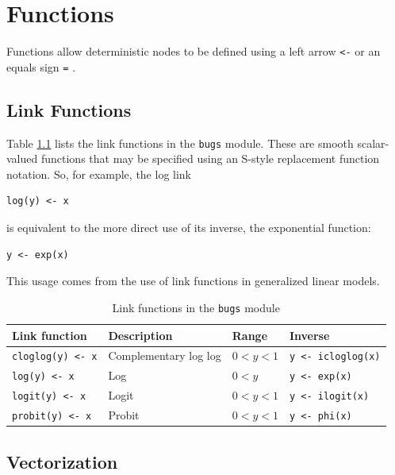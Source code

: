 \documentclass[11pt, a4paper, titlepage]{report}
\begin{document}
\chapter{Functions}
\label{section:functions}

Functions allow deterministic nodes to be defined using a left arrow
\verb+<-+ or an equals sign \verb+=+ .

\section{Link Functions}

Table \ref{table:bugs:link} lists the link functions in the
\texttt{bugs} module.  These are smooth scalar-valued functions that
may be specified using an S-style replacement function notation. So,
for example, the log link
\begin{verbatim}
log(y) <- x
\end{verbatim}
is equivalent to the more direct use of its inverse, the exponential
function:
\begin{verbatim}
y <- exp(x)
\end{verbatim}
This usage comes from the use of link functions in generalized linear
models.

\begin{table}
\begin{center}
\begin{tabular}{llll}
\hline
Link function         & Description & Range & Inverse \\
\hline
\verb+cloglog(y) <- x+ & Complementary log log & $0 < y < 1$ & \verb+y <- icloglog(x)+ \\
\verb+log(y) <- x+    & Log           & $0 < y$ &  \verb+y <- exp(x)+ \\
\verb+logit(y) <- x+  & Logit         & $0 < y < 1$ &  \verb+y <- ilogit(x)+ \\
\verb+probit(y) <- x+ & Probit        & $0 < y < 1$ &  \verb+y <- phi(x)+\\
\hline
\end{tabular}
\caption{Link functions in the \texttt{bugs} module \label{table:bugs:link}}
\end{center}
\end{table}


\section{Vectorization}
\end{document}
